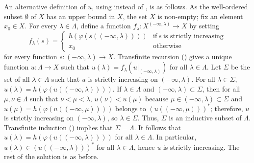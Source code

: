 \documentclass{article}
\begin{document}
\begin{solution}[\ref{exe:k8tmok20}]
  An alternative definition of \(u\), using 
  instead of , is as follows.  As the well-ordered
  subset \(\emptyset\) of \(X\) has an upper bound in \(X\), the set
  \(X\) is non-empty; fix an element \(x_0 \in X\).  For every
  \(\lambda \in \Lambda\), define a function
  \(f_\lambda : X^{(-\infty, \lambda)} \to X\) by setting
  \begin{displaymath}
    f_\lambda(s) =
    \begin{cases}
      h(\varphi(s((-\infty, \lambda))))
      & \text{if} ~ s ~ \text{is strictly increasing} \\
      x_0
      &
        \text{otherwise}
    \end{cases}
  \end{displaymath}
  for every function \(s : (-\infty, \lambda) \to X\).  Transfinite
  recursion () gives a unique function
  \(u : \Lambda \to X\) such that
  \(u(\lambda) = f_\lambda(u \vert_{(-\infty, \lambda)})\) for all
  \(\lambda \in \Lambda\).  Let \(\Sigma\) be the set of all
  \(\lambda \in \Lambda\) such that \(u\) is strictly increasing on
  \((-\infty, \lambda)\).  For all \(\lambda \in \Sigma\),
  \(u(\lambda) = h(\varphi(u((-\infty, \lambda))))\).  If
  \(\lambda \in \Lambda\) and \((-\infty, \lambda) \subset \Sigma\),
  then for all \(\mu, \nu \in \Lambda\) such that
  \(\nu < \mu < \lambda\), \(u(\nu) < u(\mu)\) because
  \(\mu \in (-\infty, \lambda) \subset \Sigma\) and
  \(u(\mu) = h(\varphi(u((-\infty, \mu))))\) belongs to
  \((u((-\infty, \mu)))^*\); therefore, \(u\) is strictly increasing
  on \((-\infty, \lambda)\), so \(\lambda \in \Sigma\).  Thus,
  \(\Sigma\) is an inductive subset of \(\Lambda\).  Transfinite
  induction () implies that \(\Sigma = \Lambda\).
  It follows that \(u(\lambda) = h(\varphi(u((-\infty, \lambda))))\)
  for all \(\lambda \in \Lambda\).  In particular,
  \(u(\lambda) \in (u((-\infty, \lambda)))^*\) for all
  \(\lambda \in \Lambda\), hence \(u\) is strictly increasing.  The
  rest of the solution is as before.
\end{solution}
\end{document}
